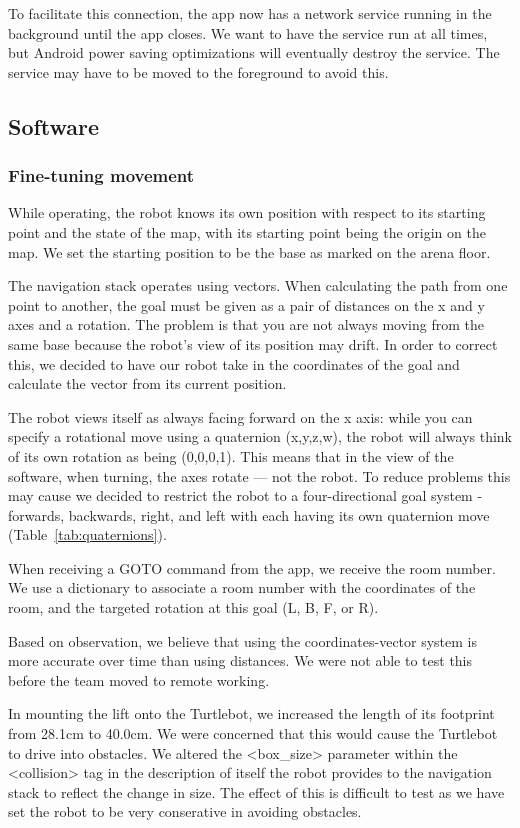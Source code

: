 \documentclass{article}
\begin{document}
To facilitate this connection, the app now has a network service running in the background until the app closes. We want to have the service run at all times, but Android power saving optimizations will eventually destroy the service. The service may have to be moved to the foreground to avoid this. 
\subsection{Software}
\subsubsection{Fine-tuning movement}
While operating, the robot knows its own position with respect to its starting point and the state of the map, with its starting point being the origin on the map. We set the starting position to be the base as marked on the arena floor. 

The navigation stack operates using vectors. When calculating the path from one point to another, the goal must be given as a pair of distances on the x and y axes and a rotation. The problem is that you are not always moving from the same base because the robot's view of its position may drift. In order to correct this, we decided to have our robot take in the coordinates of the goal and calculate the vector from its current position.

The robot views itself as always facing forward on the x axis: while you can specify a rotational move using a quaternion (x,y,z,w), the robot will always think of its own rotation as being (0,0,0,1). This means that in the view of the software, when turning, the axes rotate --- not the robot. To reduce problems this may cause we decided to restrict the robot to a four-directional goal system - forwards, backwards, right, and left with each having its own quaternion move (Table~\ref{tab:quaternions}).

When receiving a GOTO command from the app, we receive the room number. We use a dictionary to associate a room number with the coordinates of the room, and the targeted rotation at this goal (L, B, F, or R).

Based on observation, we believe that using the coordinates-vector system is more accurate over time than using distances. We were not able to test this before the team moved to remote working. 

In mounting the lift onto the Turtlebot, we increased the length of its footprint from 28.1cm to 40.0cm. We were concerned that this would cause the Turtlebot to drive into obstacles. We altered the <box\_size> parameter within the <collision> tag in the description of itself the robot provides to the navigation stack to reflect the change in size. The effect of this is difficult to test as we have set the robot to be very conserative in avoiding obstacles. 
\end{document}
